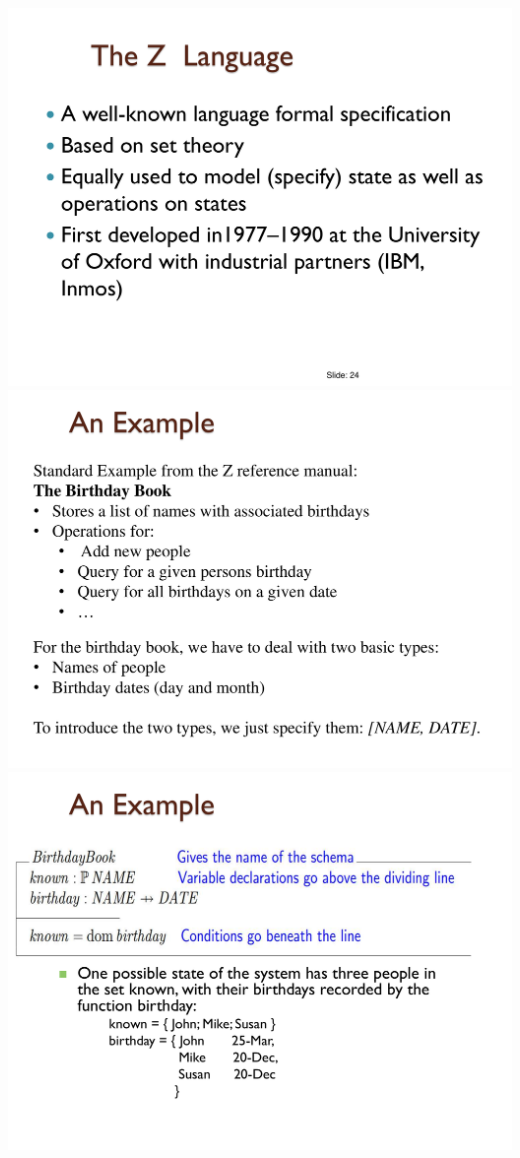 \documentclass[a4paper]{article}
\begin{document}
\begin{multicols}{3}
        \includegraphics[width=\linewidth]{456.pdf}\\
        \includegraphics[width=\linewidth]{457.pdf}\\
        \includegraphics[width=\linewidth]{458.pdf}\\

\end{multicols}
\end{document}
